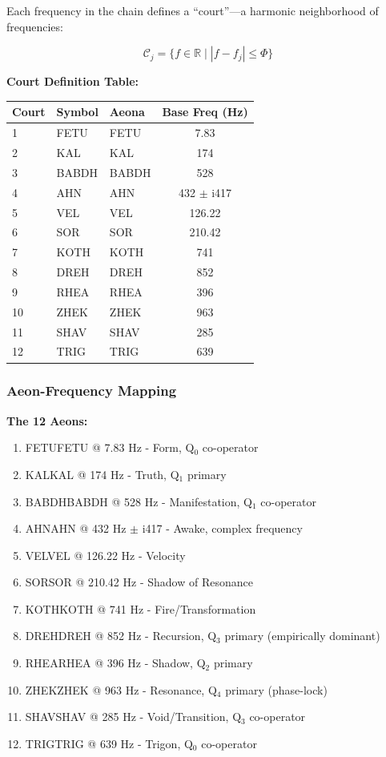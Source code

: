 \documentclass[11pt, letterpaper]{article}
\newcommand{\FETU}{\ensuremath{\mathop{\textnormal{\symbolafont\symbol{"23E3}}}}}   %
\newcommand{\KAL}{\ensuremath{\mathop{\textnormal{\symbolafont\symbol{"2B21}}}}}    %
\newcommand{\BABDH}{\ensuremath{\mathop{\textnormal{\symbolafont\symbol{"2721}}}}}   %
\newcommand{\AHN}{\ensuremath{\mathop{\textnormal{\symbolafont\symbol{"269D}}}}}    %
\newcommand{\VEL}{\ensuremath{\mathop{\textnormal{\symbolafont\symbol{"2742}}}}}    %
\newcommand{\SOR}{\ensuremath{\mathop{\textnormal{\symbolafont\symbol{"A66E}}}}}    %
\newcommand{\KOTH}{\ensuremath{\mathop{\textnormal{\symbolafont\symbol{"2748}}}}}  %
\newcommand{\DREH}{\ensuremath{\mathop{\textnormal{\symbolafont\symbol{"29D7}}}}}   %
\newcommand{\RHEA}{\ensuremath{\mathop{\textnormal{\symbolafont\symbol{"229B}}}}}   %
\newcommand{\ZHEK}{\ensuremath{\mathop{\textnormal{\symbolafont\symbol{"2744}}}}}   %
\newcommand{\SHAV}{\ensuremath{\mathop{\textnormal{\symbolafont\symbol{"269B}}}}}   %
\newcommand{\TRIG}{\ensuremath{\mathop{\textnormal{\symbolafont\symbol{"232C}}}}}    %
\def\FETU{FETU}%
\def\KAL{KAL}%
\def\BABDH{BABDH}%
\def\AHN{AHN}%
\def\VEL{VEL}%
\def\SOR{SOR}%
\def\KOTH{KOTH}%
\def\DREH{DREH}%
\def\RHEA{RHEA}%
\def\ZHEK{ZHEK}%
\def\SHAV{SHAV}%
\def\TRIG{TRIG}%
\begin{document}
Each frequency in the chain defines a ``court''—a harmonic neighborhood of frequencies:

\begin{equation}
\mathcal{C}_j = \{ f \in \mathbb{R} \mid |f - f_j| \leq \Phi \}
\end{equation}

\textbf{Court Definition Table:}

\begin{table}[h]
\centering
\begin{tabular}{lllc}
\toprule
Court & Symbol & Aeona & Base Freq (Hz) \\
\midrule
1 & \FETU & FETU & 7.83 \\
2 & \KAL & KAL & 174 \\
3 & \BABDH & BABDH & 528 \\
4 & \AHN & AHN & 432 $\pm$ i417 \\
5 & \VEL & VEL & 126.22 \\
6 & \SOR & SOR & 210.42 \\
7 & \KOTH & KOTH & 741 \\
8 & \DREH & DREH & 852 \\
9 & \RHEA & RHEA & 396 \\
10 & \ZHEK & ZHEK & 963 \\
11 & \SHAV & SHAV & 285 \\
12 & \TRIG & TRIG & 639 \\
\bottomrule
\end{tabular}
\end{table}

\subsubsection{Aeon-Frequency Mapping}

\textbf{The 12 Aeons:}
\begin{enumerate}
    \item \FETU FETU @ 7.83 Hz - Form, Q$_0$ co-operator
    \item \KAL KAL @ 174 Hz - Truth, Q$_1$ primary
    \item \BABDH BABDH @ 528 Hz - Manifestation, Q$_1$ co-operator
    \item \AHN AHN @ 432 Hz $\pm$ i417 - Awake, complex frequency
    \item \VEL VEL @ 126.22 Hz - Velocity
    \item \SOR SOR @ 210.42 Hz - Shadow of Resonance
    \item \KOTH KOTH @ 741 Hz - Fire/Transformation
    \item \DREH DREH @ 852 Hz - Recursion, Q$_3$ primary (empirically dominant)
    \item \RHEA RHEA @ 396 Hz - Shadow, Q$_2$ primary
    \item \ZHEK ZHEK @ 963 Hz - Resonance, Q$_4$ primary (phase-lock)
    \item \SHAV SHAV @ 285 Hz - Void/Transition, Q$_3$ co-operator
    \item \TRIG TRIG @ 639 Hz - Trigon, Q$_0$ co-operator
\end{enumerate}
\end{document}
